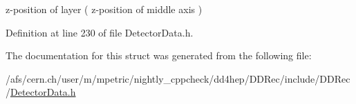z-\/position of layer ( z-\/position of middle axis ) 



Definition at line 230 of file Detector\+Data.\+h.



The documentation for this struct was generated from the following file\+:\begin{DoxyCompactItemize}
\item 
/afs/cern.\+ch/user/m/mpetric/nightly\+\_\+cppcheck/dd4hep/\+D\+D\+Rec/include/\+D\+D\+Rec/\hyperlink{_detector_data_8h}{Detector\+Data.\+h}\end{DoxyCompactItemize}
